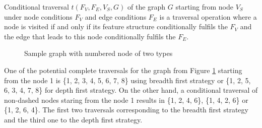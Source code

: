 
    \begin{definition}\label{def:conditional-traversal}
        Conditional traversal $t(F_V,F_E,V_S,G)$ of the graph $G$ starting from node $V_S$ under node conditions $F_V$ and edge conditions $F_E$ is a traversal operation where a node is visited if and only if its feature structure conditionally fulfils the $F_V$ and the edge that leads to this node conditionally fulfils the $F_E$.
    \end{definition}


    \begin{figure}[!ht]
        \centering
        \caption{Sample graph with numbered node of two types}
        \label{fig:example-traversal1}
    \end{figure}

    One of the potential complete traversals for the graph from Figure \ref{fig:example-traversal1} starting from the node 1 is \{1, 2, 3, 4, 5, 6, 7, 8\} using breadth first strategy or \{1, 2, 5, 6, 3, 4, 7, 8\} for depth first strategy. On the other hand, a conditional traversal of non-dashed nodes staring from the node 1 results in \{1, 2, 4, 6\}, \{1, 4, 2, 6\} or \{1, 2, 6, 4\}. The first two traversals corresponding to the breadth first strategy and the third one to the depth first strategy. 

